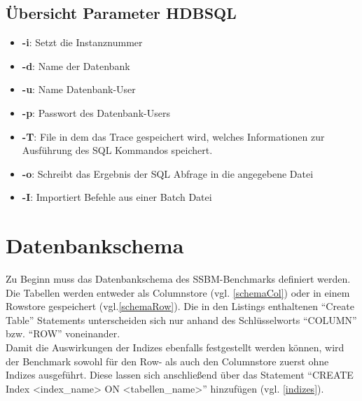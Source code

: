 \subsection{Übersicht Parameter HDBSQL}
\begin{itemize}
	\item \textbf{-i}: Setzt die Instanznummer
	\item \textbf{-d}: Name der Datenbank
	\item \textbf{-u}: Name Datenbank-User
	\item \textbf{-p}: Passwort des Datenbank-Users
	\item \textbf{-T}: File in dem das Trace gespeichert wird, welches Informationen zur Ausführung des SQL Kommandos speichert.
	\item \textbf{-o}: Schreibt das Ergebnis der SQL Abfrage in die angegebene Datei
	\item \textbf{-I}: Importiert Befehle aus einer Batch Datei
\end{itemize}




\section{Datenbankschema}
Zu Beginn muss das Datenbankschema des SSBM-Benchmarks definiert werden. Die Tabellen werden entweder als Columnstore (vgl. \autoref{schemaCol})  oder in einem Rowstore gespeichert (vgl.\autoref{schemaRow}). Die in den Listings enthaltenen \enquote{Create Table} Statements unterscheiden sich nur anhand des Schlüsselworts \enquote{COLUMN} bzw. \enquote{ROW} voneinander. 
\\Damit die Auswirkungen der Indizes ebenfalls festgestellt werden können, wird der Benchmark sowohl für den Row- als auch den Columnstore zuerst ohne Indizes ausgeführt. Diese lassen sich anschließend über das Statement \enquote{CREATE Index <index\_name> ON <tabellen\_name>} hinzufügen (vgl. \autoref{indizes}).

